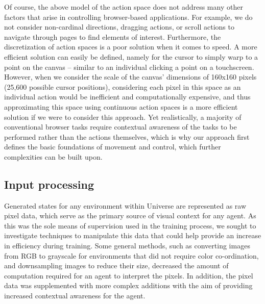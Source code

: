 \documentclass[10pt,journal,compsoc]{IEEEtran}
\begin{document}
Of course, the above model of the action space does not address many other factors that arise in controlling browser-based applications. For example, we do not consider non-cardinal directions, dragging actions, or scroll actions to navigate through pages to find elements of interest. Furthermore, the discretization of action spaces is a poor solution when it comes to speed. A more efficient solution can easily be defined, namely for the cursor to simply warp to a point on the canvas -- similar to an individual clicking a point on a touchscreen. However, when we consider the scale of the canvas' dimensions of 160x160 pixels (25,600 possible cursor positions), considering each pixel in this space as an individual action would be inefficient and computationally expensive, and thus approximating this space using continuous action spaces is a more efficient solution if we were to consider this approach. Yet realistically, a majority of conventional browser tasks require contextual awareness of the tasks to be performed rather than the actions themselves, which is why our approach first defines the basic foundations of movement and control, which further complexities can be built upon.

\subsection{Input processing}
Generated states for any environment within Universe are represented as raw pixel data, which serve as the primary source of visual context for any agent. As this was the sole means of supervision used in the training process, we sought to investigate techniques to manipulate this data that could help provide an increase in efficiency during training. Some general methods, such as converting images from RGB to grayscale for environments that did not require color co-ordination, and downsampling images to reduce their size, decreased the amount of computation required for an agent to interpret the pixels. In addition, the pixel data was supplemented with more complex additions with the aim of providing increased contextual awareness for the agent.
\end{document}
